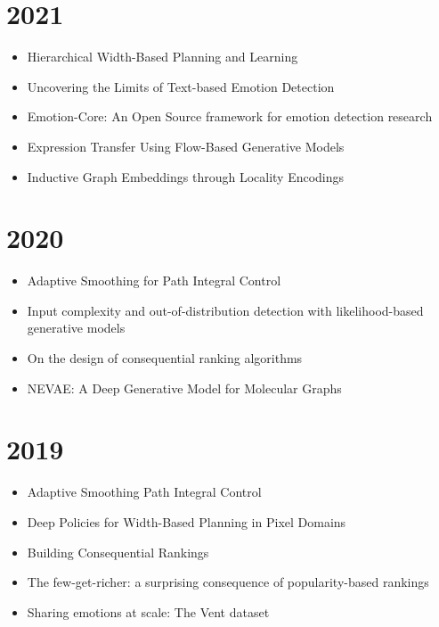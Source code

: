 \documentclass{article}
\begin{document}
\section*{2021}

\begin{itemize}
\item Hierarchical Width-Based Planning and Learning~\cite{junyent2021hierarchical}
\item Uncovering the Limits of Text-based Emotion Detection~\cite{nur21b}
\item Emotion-Core: An Open Source framework for emotion detection research~\cite{nur21c}
\item Expression Transfer Using Flow-Based Generative Models~\cite{Valenzuela_2021_CVPR}
\item Inductive Graph Embeddings through Locality Encodings~\cite{nur21a}
\end{itemize}

\section*{2020}
\begin{itemize}
\item Adaptive Smoothing for Path Integral Control~\cite{JMLR:v21:18-624}
\item Input complexity and out-of-distribution detection with likelihood-based generative models~\cite{serra2020}
\item On the design of consequential ranking algorithms~\cite{pmlr-v124-tabibian20a}
\item NEVAE: A Deep Generative Model for Molecular Graphs~\cite{JMLR:v21:19-671}
\end{itemize}
\section*{2019}
\begin{itemize}
\item Adaptive Smoothing Path Integral Control~\cite{thalmeier2019}
\item Deep Policies for Width-Based Planning in Pixel Domains~\cite{junyent2019}
\item Building Consequential Rankings~\cite{Tabibian2019}
\item The few-get-richer: a surprising consequence of popularity-based rankings~\cite{fewgetricher2019}
\item Sharing emotions at scale: The Vent dataset~\cite{vent}
\end{itemize}
\end{document}
